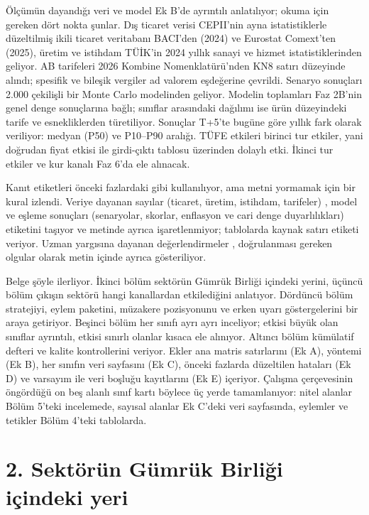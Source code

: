 Ölçümün dayandığı veri ve model Ek B'de ayrıntılı anlatılıyor; okuma için gereken dört nokta şunlar. Dış ticaret verisi CEPII'nin ayna istatistiklerle düzeltilmiş ikili ticaret veritabanı BACI'den (2024) ve Eurostat Comext'ten (2025), üretim ve istihdam TÜİK'in 2024 yıllık sanayi ve hizmet istatistiklerinden geliyor. AB tarifeleri 2026 Kombine Nomenklatürü'nden KN8 satırı düzeyinde alındı; spesifik ve bileşik vergiler ad valorem eşdeğerine çevrildi. Senaryo sonuçları 2.000 çekilişli bir Monte Carlo modelinden geliyor. Modelin toplamları Faz 2B'nin genel denge sonuçlarına bağlı; sınıflar arasındaki dağılımı ise ürün düzeyindeki tarife ve esnekliklerden türetiliyor. Sonuçlar T+5'te bugüne göre yıllık fark olarak veriliyor: medyan (P50) ve P10--P90 aralığı. TÜFE etkileri birinci tur etkiler, yani doğrudan fiyat etkisi ile girdi-çıktı tablosu üzerinden dolaylı etki. İkinci tur etkiler ve kur kanalı Faz 6'da ele alınacak.

Kanıt etiketleri önceki fazlardaki gibi kullanılıyor, ama metni yormamak için bir kural izlendi. Veriye dayanan sayılar (ticaret, üretim, istihdam, tarifeler) \etiketV{}, model ve eşleme sonuçları (senaryolar, skorlar, enflasyon ve cari denge duyarlılıkları) \etiketT{} etiketini taşıyor ve metinde ayrıca işaretlenmiyor; tablolarda kaynak satırı etiketi veriyor. Uzman yargısına dayanan değerlendirmeler \etiketH{}, doğrulanması gereken olgular \etiketD{} olarak metin içinde ayrıca gösteriliyor.

Belge şöyle ilerliyor. İkinci bölüm sektörün Gümrük Birliği içindeki yerini, üçüncü bölüm çıkışın sektörü hangi kanallardan etkilediğini anlatıyor. Dördüncü bölüm stratejiyi, eylem paketini, müzakere pozisyonunu ve erken uyarı göstergelerini bir araya getiriyor. Beşinci bölüm her sınıfı ayrı ayrı inceliyor; etkisi büyük olan sınıflar ayrıntılı, etkisi sınırlı olanlar kısaca ele alınıyor. Altıncı bölüm kümülatif defteri ve kalite kontrollerini veriyor. Ekler ana matris satırlarını (Ek A), yöntemi (Ek B), her sınıfın veri sayfasını (Ek C), önceki fazlarda düzeltilen hataları (Ek D) ve varsayım ile veri boşluğu kayıtlarını (Ek E) içeriyor. Çalışma çerçevesinin öngördüğü on beş alanlı sınıf kartı böylece üç yerde tamamlanıyor: nitel alanlar Bölüm 5'teki incelemede, sayısal alanlar Ek C'deki veri sayfasında, eylemler ve tetikler Bölüm 4'teki tablolarda.

\hypertarget{nace_kartlar_10-12-2-sektuxf6ruxfcn-guxfcmruxfck-birliux11fi-iuxe7indeki-yeri}{%
\section{2. Sektörün Gümrük Birliği içindeki yeri}\label{nace_kartlar_10-12-2-sektuxf6ruxfcn-guxfcmruxfck-birliux11fi-iuxe7indeki-yeri}}

